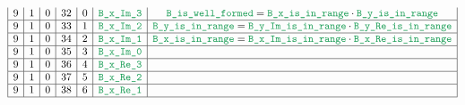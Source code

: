 \begin{figure}[h!]
\begin{adjustwidth}{-2cm}{-2cm}
{\[\begin{array}{|c|c|c|c|c|c|c|}
                    9                      & 1                                            & 0                                              & 32                     & 0                   & \locBXImThree        & \locBIsWellFormed = \locBXIsInRange   \cdot \locBYIsInRange                                                                                                           \\ \hline
                    9                      & 1                                            & 0                                              & 33                     & 1                   & \locBXImTwo          & \locBYIsInRange =   \locBYImIsInRange \cdot \locBYReIsInRange                                                                                                         \\ \hline
                    9                      & 1                                            & 0                                              & 34                     & 2                   & \locBXImOne          & \locBXIsInRange =   \locBXImIsInRange \cdot \locBXReIsInRange                                                                                                         \\ \hline
                    9                      & 1                                            & 0                                              & 35                     & 3                   & \locBXImZero         &                                                                                                                                                                       \\ \hline
                    9                      & 1                                            & 0                                              & 36                     & 4                   & \locBXReThree        &                                                                                                                                                                       \\ \hline
                    9                      & 1                                            & 0                                              & 37                     & 5                   & \locBXReTwo          &                                                                                                                                                                       \\ \hline
                    9                      & 1                                            & 0                                              & 38                     & 6                   & \locBXReOne          &                                                                                                                                                                       \\ \hline

\end{array}\]}
\end{adjustwidth}
\end{figure}
